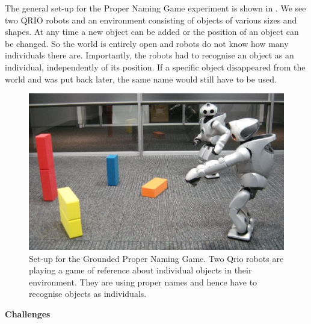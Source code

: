 The general set-up for the Proper Naming Game experiment
is shown in . We see two QRIO robots and an environment consisting of objects of various 
sizes and shapes. At any time a new object can be added or the position of an object can be changed. So the world is 
entirely open and robots do not know how many individuals there are. 
Importantly, the robots had to recognise an object as an individual, independently of its position. If 
a specific object disappeared from the world and was put back later, the same name would still have to be used. \\ 
\begin{figure}[htbp]
  \centerline{\includegraphics[width=.80\textwidth]{chap11/figs/grounded-naming-game}}
\caption{\footnotesize\label{fig:grounded} 
Set-up for the Grounded Proper Naming Game. Two Qrio robots are playing a game of reference about individual objects 
in their environment. They are using proper names and hence have to recognise objects as individuals.}
\end{figure}

{\bf Challenges} \\

